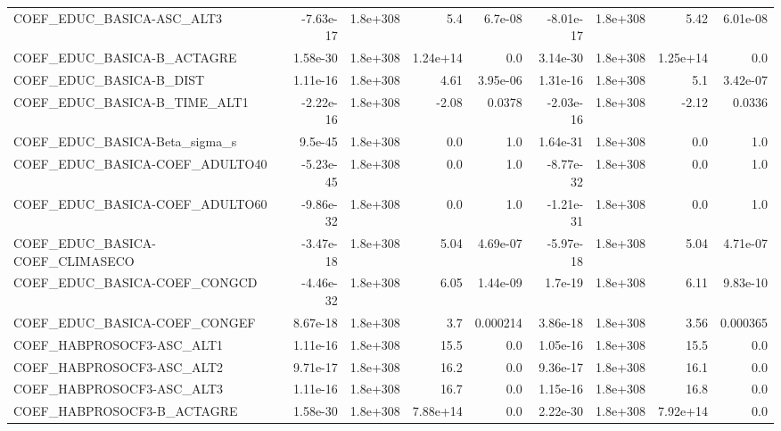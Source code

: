 \begin{tabular}{lrrrrrrrr}
COEF\_EDUC\_BASICA-ASC\_ALT3         &   -7.63e-17 &     1.8e+308 &       5.4 &  6.7e-08 &  -8.01e-17 &    1.8e+308 &         5.42 &      6.01e-08 \\
COEF\_EDUC\_BASICA-B\_ACTAGRE        &    1.58e-30 &     1.8e+308 &  1.24e+14 &      0.0 &   3.14e-30 &    1.8e+308 &     1.25e+14 &           0.0 \\
COEF\_EDUC\_BASICA-B\_DIST           &    1.11e-16 &     1.8e+308 &      4.61 & 3.95e-06 &   1.31e-16 &    1.8e+308 &          5.1 &      3.42e-07 \\
COEF\_EDUC\_BASICA-B\_TIME\_ALT1      &   -2.22e-16 &     1.8e+308 &     -2.08 &   0.0378 &  -2.03e-16 &    1.8e+308 &        -2.12 &        0.0336 \\
COEF\_EDUC\_BASICA-Beta\_sigma\_s     &     9.5e-45 &     1.8e+308 &       0.0 &      1.0 &   1.64e-31 &    1.8e+308 &          0.0 &           1.0 \\
COEF\_EDUC\_BASICA-COEF\_ADULTO40    &   -5.23e-45 &     1.8e+308 &       0.0 &      1.0 &  -8.77e-32 &    1.8e+308 &          0.0 &           1.0 \\
COEF\_EDUC\_BASICA-COEF\_ADULTO60    &   -9.86e-32 &     1.8e+308 &       0.0 &      1.0 &  -1.21e-31 &    1.8e+308 &          0.0 &           1.0 \\
COEF\_EDUC\_BASICA-COEF\_CLIMASECO   &   -3.47e-18 &     1.8e+308 &      5.04 & 4.69e-07 &  -5.97e-18 &    1.8e+308 &         5.04 &      4.71e-07 \\
COEF\_EDUC\_BASICA-COEF\_CONGCD      &   -4.46e-32 &     1.8e+308 &      6.05 & 1.44e-09 &    1.7e-19 &    1.8e+308 &         6.11 &      9.83e-10 \\
COEF\_EDUC\_BASICA-COEF\_CONGEF      &    8.67e-18 &     1.8e+308 &       3.7 & 0.000214 &   3.86e-18 &    1.8e+308 &         3.56 &      0.000365 \\
COEF\_HABPROSOCF3-ASC\_ALT1         &    1.11e-16 &     1.8e+308 &      15.5 &      0.0 &   1.05e-16 &    1.8e+308 &         15.5 &           0.0 \\
COEF\_HABPROSOCF3-ASC\_ALT2         &    9.71e-17 &     1.8e+308 &      16.2 &      0.0 &   9.36e-17 &    1.8e+308 &         16.1 &           0.0 \\
COEF\_HABPROSOCF3-ASC\_ALT3         &    1.11e-16 &     1.8e+308 &      16.7 &      0.0 &   1.15e-16 &    1.8e+308 &         16.8 &           0.0 \\
COEF\_HABPROSOCF3-B\_ACTAGRE        &    1.58e-30 &     1.8e+308 &  7.88e+14 &      0.0 &   2.22e-30 &    1.8e+308 &     7.92e+14 &           0.0 \\

\end{tabular}
